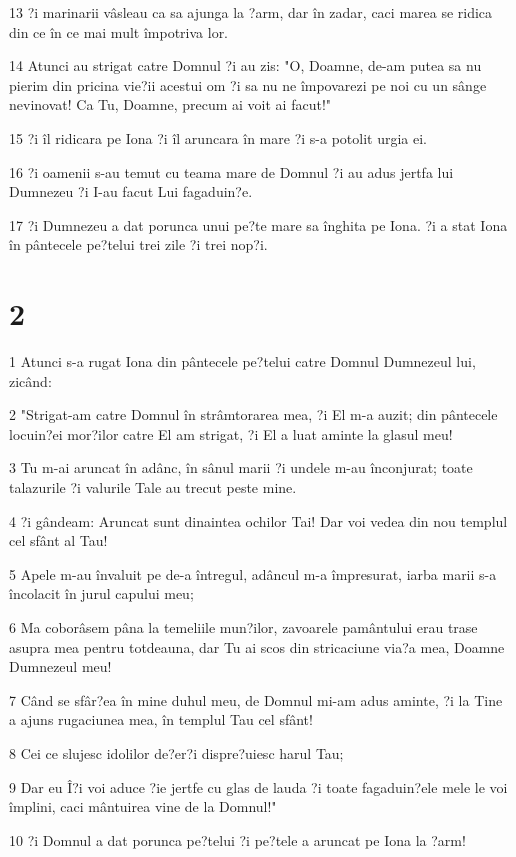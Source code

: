 \par 13 ?i marinarii vâsleau ca sa ajunga la ?arm, dar în zadar, caci marea se ridica din ce în ce mai mult împotriva lor.
\par 14 Atunci au strigat catre Domnul ?i au zis: "O, Doamne, de-am putea sa nu pierim din pricina vie?ii acestui om ?i sa nu ne împovarezi pe noi cu un sânge nevinovat! Ca Tu, Doamne, precum ai voit ai facut!"
\par 15 ?i îl ridicara pe Iona ?i îl aruncara în mare ?i s-a potolit urgia ei.
\par 16 ?i oamenii s-au temut cu teama mare de Domnul ?i au adus jertfa lui Dumnezeu ?i I-au facut Lui fagaduin?e.
\par 17 ?i Dumnezeu a dat porunca unui pe?te mare sa înghita pe Iona. ?i a stat Iona în pântecele pe?telui trei zile ?i trei nop?i.

\chapter{2}

\par 1 Atunci s-a rugat Iona din pântecele pe?telui catre Domnul Dumnezeul lui, zicând:
\par 2 "Strigat-am catre Domnul în strâmtorarea mea, ?i El m-a auzit; din pântecele locuin?ei mor?ilor catre El am strigat, ?i El a luat aminte la glasul meu!
\par 3 Tu m-ai aruncat în adânc, în sânul marii ?i undele m-au înconjurat; toate talazurile ?i valurile Tale au trecut peste mine.
\par 4 ?i gândeam: Aruncat sunt dinaintea ochilor Tai! Dar voi vedea din nou templul cel sfânt al Tau!
\par 5 Apele m-au învaluit pe de-a întregul, adâncul m-a împresurat, iarba marii s-a încolacit în jurul capului meu;
\par 6 Ma coborâsem pâna la temeliile mun?ilor, zavoarele pamântului erau trase asupra mea pentru totdeauna, dar Tu ai scos din stricaciune via?a mea, Doamne Dumnezeul meu!
\par 7 Când se sfâr?ea în mine duhul meu, de Domnul mi-am adus aminte, ?i la Tine a ajuns rugaciunea mea, în templul Tau cel sfânt!
\par 8 Cei ce slujesc idolilor de?er?i dispre?uiesc harul Tau;
\par 9 Dar eu Î?i voi aduce ?ie jertfe cu glas de lauda ?i toate fagaduin?ele mele le voi împlini, caci mântuirea vine de la Domnul!"
\par 10 ?i Domnul a dat porunca pe?telui ?i pe?tele a aruncat pe Iona la ?arm!

